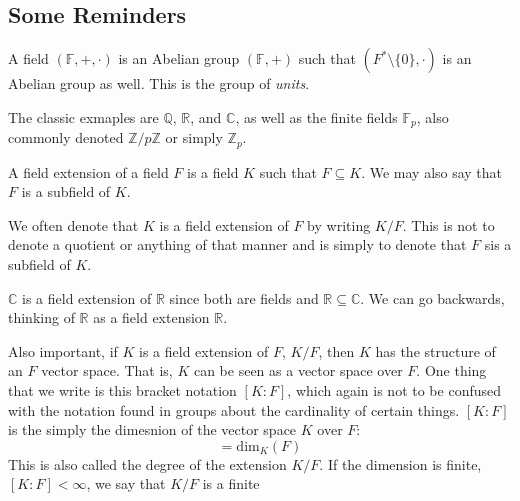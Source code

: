 \documentclass{article}                                                        %
\begin{document}
        \subsection{Some Reminders}
            \begin{definition}
                A field $(\mathbb{F},+,\cdot)$ is an Abelian group
                $(\mathbb{F},+)$ such that $(F^{*}\setminus\{0\},\cdot)$ is an
                Abelian group as well. This is the group of \textit{units}.
            \end{definition}
            \begin{example}
                The classic exmaples are $\mathbb{Q}$, $\mathbb{R}$, and
                $\mathbb{C}$, as well as the finite fields $\mathbb{F}_{p}$,
                also commonly denoted $\mathbb{Z}/p\mathbb{Z}$ or simply
                $\mathbb{Z}_{p}$.
            \end{example}
            \begin{definition}
                A field extension of a field $F$ is a field $K$ such that
                $F\subseteq{K}$. We may also say that $F$ is a subfield of $K$.
            \end{definition}
            We often denote that $K$ is a field extension of $F$ by writing
            $K/F$. This is not to denote a quotient or anything of that manner
            and is simply to denote that $F$ sis a subfield of $K$.
            \begin{example}
                $\mathbb{C}$ is a field extension of $\mathbb{R}$ since both are
                fields and $\mathbb{R}\subseteq\mathbb{C}$. We can go backwards,
                thinking of $\mathbb{R}$ as a field extension $\mathbb{R}$.
            \end{example}
            Also important, if $K$ is a field extension of $F$, $K/F$, then
            $K$ has the structure of an $F$ vector space. That is, $K$ can be
            seen as a vector space over $F$. One thing that we write is this
            bracket notation $[K:F]$, which again is not to be confused with
            the notation found in groups about the cardinality of certain
            things. $[K:F]$ is the simply the dimesnion of the vector space
            $K$ over $F$:
            \begin{equation}
                [K:F]=\textrm{dim}_{K}(F)
            \end{equation}
            This is also called the degree of the extension $K/F$. If the
            dimension is finite, $[K:F]<\infty$, we say that $K/F$ is a finite
\end{document}
